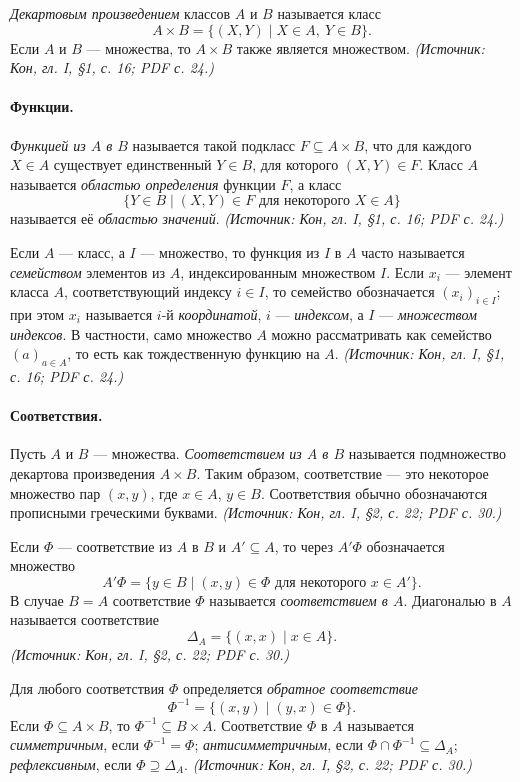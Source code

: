 \documentclass[a4paper,12pt]{article}
\begin{document}
\emph{Декартовым произведением} классов \(A\) и \(B\) называется класс
\[
A\times B=\{(X,Y)\mid X\in A,\ Y\in B\}.
\]
Если \(A\) и \(B\) — множества, то \(A\times B\) также является множеством.
\textit{(Источник: Кон, гл. I, §1, с. 16; PDF с. 24.)}

\paragraph{Функции.}
\emph{Функцией из \(A\) в \(B\)} называется такой подкласс \(F\subseteq A\times B\), что для каждого \(X\in A\) существует единственный \(Y\in B\), для которого \((X,Y)\in F\). Класс \(A\) называется \emph{областью определения} функции \(F\), а класс
\[
\{Y\in B\mid (X,Y)\in F\text{ для некоторого }X\in A\}
\]
называется её \emph{областью значений}.
\textit{(Источник: Кон, гл. I, §1, с. 16; PDF с. 24.)}

Если \(A\) — класс, а \(I\) — множество, то функция из \(I\) в \(A\) часто называется \emph{семейством} элементов из \(A\), индексированным множеством \(I\). Если \(x_i\) — элемент класса \(A\), соответствующий индексу \(i\in I\), то семейство обозначается \((x_i)_{i\in I}\); при этом \(x_i\) называется \(i\)-й \emph{координатой}, \(i\) — \emph{индексом}, а \(I\) — \emph{множеством индексов}. В частности, само множество \(A\) можно рассматривать как семейство \((a)_{a\in A}\), то есть как тождественную функцию на \(A\).
\textit{(Источник: Кон, гл. I, §1, с. 16; PDF с. 24.)}

\paragraph{Соответствия.}
Пусть \(A\) и \(B\) — множества. \emph{Соответствием из \(A\) в \(B\)} называется подмножество декартова произведения \(A\times B\). Таким образом, соответствие — это некоторое множество пар \((x,y)\), где \(x\in A\), \(y\in B\). Соответствия обычно обозначаются прописными греческими буквами.
\textit{(Источник: Кон, гл. I, §2, с. 22; PDF с. 30.)}

Если \(\Phi\) — соответствие из \(A\) в \(B\) и \(A'\subseteq A\), то через \(A'\Phi\) обозначается множество
\[
A'\Phi=\{y\in B\mid (x,y)\in\Phi\text{ для некоторого }x\in A'\}.
\]
В случае \(B=A\) соответствие \(\Phi\) называется \emph{соответствием в \(A\)}. Диагональю в \(A\) называется соответствие
\[
\Delta_A=\{(x,x)\mid x\in A\}.
\]
\textit{(Источник: Кон, гл. I, §2, с. 22; PDF с. 30.)}

Для любого соответствия \(\Phi\) определяется \emph{обратное соответствие}
\[
\Phi^{-1}=\{(x,y)\mid (y,x)\in\Phi\}.
\]
Если \(\Phi\subseteq A\times B\), то \(\Phi^{-1}\subseteq B\times A\). Соответствие \(\Phi\) в \(A\) называется \emph{симметричным}, если \(\Phi^{-1}=\Phi\); \emph{антисимметричным}, если \(\Phi\cap\Phi^{-1}\subseteq\Delta_A\); \emph{рефлексивным}, если \(\Phi\supseteq\Delta_A\).
\textit{(Источник: Кон, гл. I, §2, с. 22; PDF с. 30.)}
\end{document}
